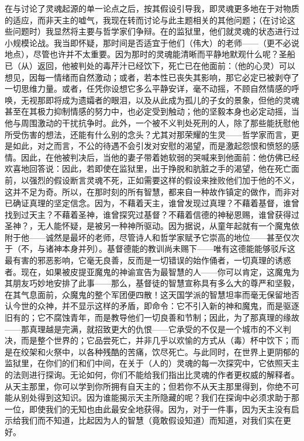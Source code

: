 在与讨论了灵魂起源的单一论点之后，按其假设引导我，即灵魂更多地在于对物质的适应，而非天主的嘘气，我现在转而讨论与此主题相关的其他问题；（在讨论这些问题时）我显然将主要与哲学家们争辩。在的监狱里，他们就灵魂的状态进行过小规模论战。我当即怀疑，那时间是否适宜于他们（伟大）的老师——（更不必说地点），尽管也许并不太重要。因为那时的灵魂能清晰而平静地默观什么呢？圣船已（从）返回，他被判处的毒芹汁已经饮下，死亡已在他面前：（他的心灵）可以想见，因每一情绪而自然激动；或者，若本性已丧失其影响，那它必定已被剥夺了一切思维力量。或者，任凭你设想它多么平静安详，毫不动摇，不顾自然情感的呼唤，无视那即将成为遗孀者的眼泪，以及从此成为孤儿的子女的景象，但他的灵魂甚至在其极力抑制情感的努力中，也必定受到触动；他的坚毅本身也必定动摇，当他与周围激动的干扰抗争时。此外，一个被不义判处死刑的人，除了那些能抚慰他所受伤害的想法，还能有什么别的念头？尤其对那荣耀的生灵——哲学家而言，更是如此，对之而言，不公的待遇不会引发对安慰的渴望，而是激起怨恨和愤怒的感情。因此，在他被判决后，当他的妻子带着她软弱的哭喊来到他面前：他仿佛已经欢喜地回答说：因此，若即使在监狱里，出于挣脱和肮脏之手的渴望，他在死亡面前，以强烈的假设断言灵魂不死，正如需要这样的假设来挫败他们加于他的不义，这并不足为奇。所以，在那时刻的所有智慧，都来自一种故作镇定的做作，而非对已确证真理的坚定信念。因为，不藉着天主，谁曾发现过真理？不藉着基督，谁曾找到过天主？不藉着圣神，谁曾探究过基督？不藉着信德的神秘恩赐，谁曾获得过圣神？，无人能怀疑，是被另一种神所驱动。因为据说，从童年起就有一个魔鬼依附于他——诚然是最坏的老师，尽管诗人和哲学家赋予它崇高的地位——甚至仅次于（不，与诸神本身并列）。基督德能的教训尚未赐下——唯有这德能能够驳斥这最有害的邪恶影响，它毫无良善，反而是一切错误的始作俑者，一切真理的诱惑者。现在，如果被皮提亚魔鬼的神谕宣告为最智慧的人——你可以肯定，这魔鬼为其朋友巧妙地安排了此事——那么，基督徒的智慧宣称具有多么大的尊严和坚毅，在其气息面前，众魔鬼的整个军团便四散！这天国学派的智慧坦率而毫无保留地否认今世的众神，并不显示这样的矛盾，即命令：它不引入新的神和魔鬼，而是驱逐旧有的；它不腐蚀青年，而是教导他们一切良善和节制；因此，为了那真理的缘故——那真理越是完满，就招致更大的仇恨——它承受的不仅是一个城市的不义判决，而是整个世界的；它品尝死亡，并非几乎以欢愉的方式从（毒）杯中饮下；而是在绞架和火祭中，以各种残酷的苦痛，饮尽死亡。与此同时，在世界上更阴郁的监狱里，在你们的们和们中间，在关于（人的）灵魂的每一次探究中，它依照天主的法则进行探询。无论如何，你们不能给我们指出比灵魂的作者更权威的解释者。从天主那里，你可以学到你所拥有自天主的；但若你不从天主那里得到，你绝不可能从别处得到这知识。因为谁能揭示天主所隐藏的呢？我们在探询中必须求助于那一位，即使我们的无知也由此最安全地获得。因为，对于一件事，因为天主没有启示给我们而不知道，比起因为人的智慧（竟敢假设知道）而知道，对我们实在更好。\par

